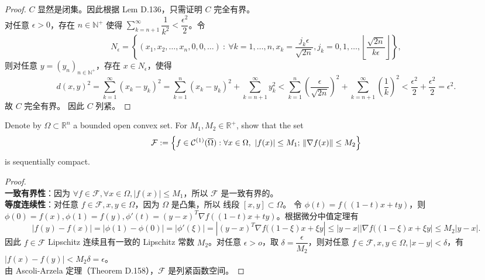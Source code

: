 \documentclass[lang=cn,a4paper,newtx,bibend=bibtex]{elegantpaper}
\begin{document}
\begin{proof}
    $C$ 显然是闭集。因此根据 Lem D.136，只需证明 $C$ 完全有界。
\\
    对任意 $\epsilon>0$，存在 $n\in \mathbb{N}^+$ 使得 $\sum_{k=n+1}^{\infty}\dfrac 1{k^2} < \dfrac{\epsilon^2}2$。令
    \begin{equation*}
        N_\epsilon = \left\{(x_1, x_2, \dots, x_n, 0, 0, \dots)~:~ \forall k = 1, \dots, n, x_k = \dfrac{j_k\epsilon}{\sqrt{2n}}, j_k = 0, 1, \dots, \left\lfloor \dfrac{\sqrt{2n}}{k\epsilon}\right\rfloor\right\},       
    \end{equation*}
    则对任意 $y = (y_n)_{n\in \mathbb{N^+}}$，存在 $x\in N_\epsilon$，使得
    \begin{equation*}
        d(x,y)^2 = \sum_{k=1}^\infty (x_k-y_k)^2 = \sum_{k=1}^n (x_k-y_k)^2 + \sum_{k=n+1}^{\infty} y_k^2 < \sum_{k=1}^n \left(\dfrac{\epsilon}{\sqrt{2n}}\right)^2 + \sum_{k=n+1}^{\infty} \left(\dfrac 1k\right)^2 < \dfrac{\epsilon^2}2 + \dfrac{\epsilon^2}2 = \epsilon^2.
    \end{equation*}
    故 $C$ 完全有界。
    因此 $C$ 列紧。
\end{proof}

\begin{prob}[D.159]
  Denote by $\Omega\subset \mathbb{R}^n$ a bounded open convex set.
  For $M_1,M_2\in\mathbb{R}^+$,
  show that the set
  \begin{equation*}
    {\cal F} := \left\{f\in {\cal C}^{(1)}(\overline{\Omega}) :
      \forall x\in \Omega,\ |f(x)|\le M_1;\, 
      \|\nabla f(x)\|\le M_2
    \right\}
  \end{equation*}
  is sequentially compact.
\end{prob}

\begin{proof}~~\\
    \textbf{一致有界性}：因为 $\forall f\in \mathcal{F}, \forall x\in \Omega, |f(x)|\leq M_1$，所以 $\mathcal{F}$ 是一致有界的。\\
    \textbf{等度连续性}：对任意 $f\in \mathcal{F}, x, y \in \Omega$，因为 $\Omega$ 是凸集，所以 线段 $[x,y]\subset \Omega$。
    令 $\phi(t) = f((1-t)x + ty)$，则 $\phi(0) = f(x), \phi(1) = f(y), \phi'(t) = (y-x)^T\nabla f((1-t)x + ty)$。根据微分中值定理有
    \begin{equation*}
        |f(y)-f(x)| = |\phi(1)-\phi(0)| = |\phi'(\xi)| = |(y-x)^T\nabla f((1-\xi)x + \xi y| \leq |y-x||\nabla f((1-\xi)x + \xi y| \leq M_2|y-x|.
    \end{equation*}
    因此 $f\in \mathcal{F}$ Lipschitz 连续且有一致的 Lipschitz 常数 $M_2$。对任意 $\epsilon>o$，取 $\delta = \dfrac{\epsilon}{M_2}$，则对任意 $f\in \mathcal{F}, x,y\in \Omega, |x-y|<\delta$，有 $|f(x)-f(y)|<M_2\delta=\epsilon$。
\\
    由 Ascoli-Arzela 定理（Theorem D.158），$\mathcal{F}$ 是列紧函数空间。
\end{proof}
\end{document}
